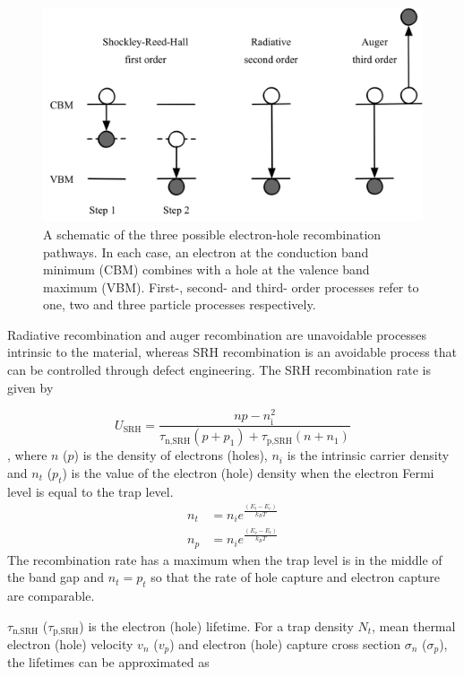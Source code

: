 \begin{figure}[h]
 \centering
   \includegraphics[width=1.0\columnwidth]{figures/ch1/recombination.png}
   \caption[Electron-hole recombination pathways]{A schematic of the three possible electron-hole recombination pathways. In each case, an electron at the conduction band minimum (CBM) combines with a hole at the valence band maximum (VBM). First-, second- and third- order processes refer to one, two and three particle processes respectively.}
   \label{recombination_processes}
 \end{figure}

Radiative recombination and auger recombination are unavoidable processes intrinsic to the material, whereas SRH recombination is an avoidable process that can be controlled through defect engineering. The SRH recombination rate is given by

$$ U_\textrm{SRH} = \frac{np-n_\textrm{i}^2}{\tau_\textrm{n,SRH}(p+p_1)+\tau_\textrm{p,SRH}(n+n_1)} $$,
where $n$ ($p$) is the density of electrons (holes), $n_i$ is the intrinsic carrier density and $n_t$ ($p_t$) is the value of the electron (hole) density when the electron Fermi level is equal to the trap level. 
\begin{align}
n_t &= n_ie^{\frac{(E_t-E_c)}{k_BT}} \\
n_p &= n_ie^{\frac{(E_v-E_t)}{k_BT}}
\end{align}
The recombination rate has a maximum when the trap level is in the middle of the band gap and $n_t = p_t$ so that the rate of hole capture and electron capture are comparable. %

$\tau_\textrm{n,SRH}$ ($\tau_\textrm{p,SRH}$) is the electron (hole) lifetime. For a trap density $N_t$, mean thermal electron (hole) velocity $v_n$ ($v_p$) and electron (hole) capture cross section $\sigma_n$ ($\sigma_p$), the lifetimes can be approximated as 

